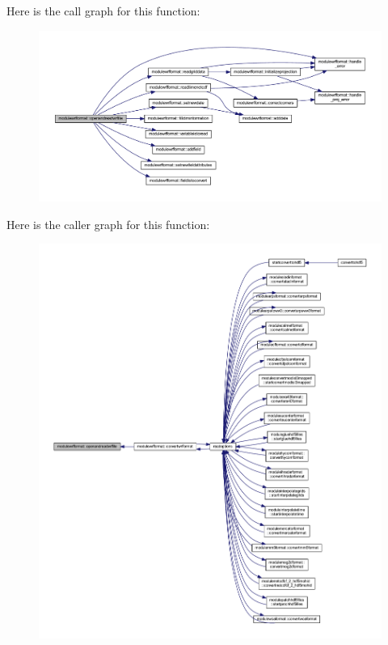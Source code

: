 Here is the call graph for this function\+:\nopagebreak
\begin{figure}[H]
\begin{center}
\leavevmode
\includegraphics[width=350pt]{namespacemodulewrfformat_ace4676af115f32ceeda15123d47bd5c8_cgraph}
\end{center}
\end{figure}
Here is the caller graph for this function\+:\nopagebreak
\begin{figure}[H]
\begin{center}
\leavevmode
\includegraphics[width=350pt]{namespacemodulewrfformat_ace4676af115f32ceeda15123d47bd5c8_icgraph}
\end{center}
\end{figure}
\mbox{\label{namespacemodulewrfformat_acba548a01d7e2ba1276dc6da267132ff}} 
